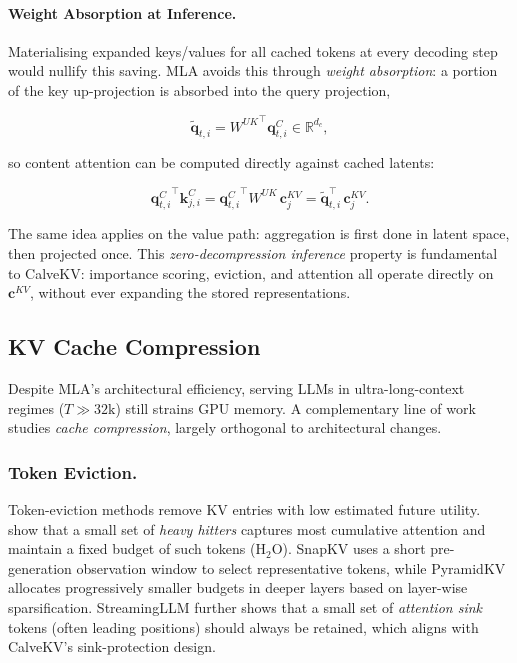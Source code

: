 \documentclass[letterpaper]{article} %
\begin{document}
\paragraph{Weight Absorption at Inference.}
Materialising expanded keys/values for all cached tokens at every decoding step
would nullify this saving. MLA avoids this through \emph{weight absorption}: a
portion of the key up-projection is absorbed into the query projection,

\begin{equation}
  \tilde{\mathbf{q}}_{t,i}
    = {W^{UK}}^{\top}\mathbf{q}_{t,i}^{C}
    \in \mathbb{R}^{d_c},
  \label{eq:q_absorb}
\end{equation}

so content attention can be computed directly against cached latents:

\begin{equation}
  {\mathbf{q}_{t,i}^{C}}^{\!\top}\mathbf{k}_{j,i}^{C}
    = {\mathbf{q}_{t,i}^{C}}^{\!\top} W^{UK}\,\mathbf{c}_{j}^{KV}
    = \tilde{\mathbf{q}}_{t,i}^{\top}\,\mathbf{c}_{j}^{KV}.
  \label{eq:weight_absorb_k}
\end{equation}

The same idea applies on the value path: aggregation is first done in latent
space, then projected once. This \emph{zero-decompression inference} property is
fundamental to
CalveKV: importance scoring, eviction, and attention all operate directly on
$\mathbf{c}^{KV}$, without ever expanding the stored representations.

\subsection{KV Cache Compression}

Despite MLA's architectural efficiency, serving LLMs in ultra-long-context
regimes ($T \gg 32\text{k}$) still strains GPU memory. A complementary line of
work studies \emph{cache compression}, largely orthogonal to architectural
changes.

\subsubsection{Token Eviction.}
Token-eviction methods remove KV entries with low estimated future utility.
\citeauthor{zhang2023h2o} show that a small set of
\emph{heavy hitters} captures most cumulative attention and maintain a fixed
budget of such tokens (H$_2$O). SnapKV \cite{li2024snapkv} uses a short
pre-generation observation window to select representative tokens, while
PyramidKV \cite{cai2024pyramidkv} allocates progressively smaller budgets in
deeper layers based on layer-wise sparsification. StreamingLLM
\cite{xiao2024streamingllm} further shows that a small set of \emph{attention
sink} tokens (often leading positions) should always be retained, which aligns
with CalveKV's sink-protection design.
\end{document}
